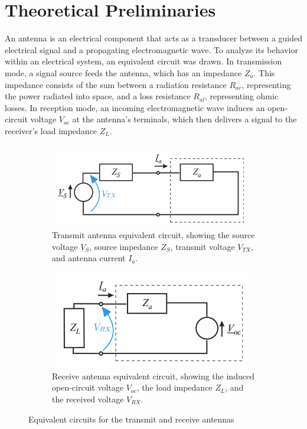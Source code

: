 \setcounter{secnumdepth}{2}
\chapter{Theoretical Preliminaries}
An antenna is an electrical component that acts as a transducer between a guided electrical signal and a propagating electromagnetic wave. To analyze its behavior within an electrical system, an equivalent circuit was drawn. In transmission mode, a signal source feeds the antenna, which has an impedance $Z_a$. This impedance consists of the sum between a radiation resistance $R_{ar}$, representing the power radiated into space, and a loss resistance $R_{al}$, representing ohmic losses. In reception mode, an incoming electromagnetic wave induces an open-circuit voltage $V_{oc}$ at the antenna's terminals, which then delivers a signal to the receiver's load impedance $Z_L$.


\begin{figure}[h!]
	\centering
	\begin{subfigure}[t]{0.48\textwidth}
		\includegraphics[width=\linewidth]{content/4-images/ant-recep.png}
		\caption{Transmit antenna equivalent circuit, showing the source voltage $V_S$, source impedance $Z_S$, transmit voltage $V_{TX}$, and antenna current $I_a$.}
		\label{fig:tx_circuit}
	\end{subfigure}
	\hfill
	\begin{subfigure}[t]{0.42\textwidth}
		\includegraphics[width=\linewidth]{content/4-images/ant-trans.png}
		\caption{Receive antenna equivalent circuit, showing the induced open-circuit voltage $V_{oc}$, the load impedance $Z_L$, and the received voltage $V_{RX}$.}
		\label{fig:RX_circuit}
	\end{subfigure}
	\caption{Equivalent circuits for the transmit and receive antennas}
	\label{fig:equivalent_circuits}
\end{figure}

